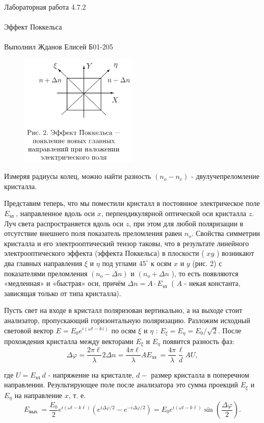 \documentclass{astroedu-lab}
\begin{document}
\begin{problem}{\huge Лабораторная работа 4.7.2\\\\Эффект Поккельса\\\\Выполнил Жданов Елисей Б01-205}
\begin{figure}[!h]
	\centering
	\includegraphics[width=0.5\textwidth]{th2.png}
	\label{fig:boiler}
\end{figure}




Измеряя радиусы колец, можно найти разность $\left(n_o-n_e\right)$ - двулучепреломление кристалла.

Представим теперь, что мы поместили кристалл в постоянное электрическое поле $E_{\text {эл }}$, направленное вдоль оси $x$, перпендикулярной оптической оси кристалла $z$. Луч света распространяется вдоль оси $z$, при этом для любой поляризации в отсутствие внешнего поля показатель преломления равен $n_o$. Свойства симметрии кристалла и его электрооптический тензор таковы, что в результате линейного электрооптического эффекта (эффекта Поккельса) в плоскости ( $x y$ ) возникают два главных направления $\xi$ и $\eta$ под углами $45^{\circ}$ к осям $x$ и $y$ (рис. 2) с показателями преломления $\left(n_o-\Delta n\right)$ и $\left(n_o+\Delta n\right.$ ), то есть появляются «медленная» и «быстрая» оси, причём $\Delta n=A \cdot E_{\text {эл }}$ ( $A$ - некая константа, зависящая только от типа кристалла).

Пусть свет на входе в кристалл поляризован вертикально, а на выходе стоит анализатор, пропускающий горизонтальную поляризацию. Разложим исходный световой вектор $E=E_0 e^{i(\omega t-k z)}$ по осям $\xi$ и $\eta$ : $E_{\xi}=E_\eta=E_0 / \sqrt{2}$. После прохождения кристалла между векторами $E_{\xi}$ и $E_\eta$ появится разность фаз:
$$
\Delta \varphi=\frac{2 \pi \ell}{\lambda} 2 \Delta n=\frac{4 \pi \ell}{\lambda} A E_{\text {эл }}=\frac{4 \pi}{\lambda} \frac{\ell}{d} A U,
$$

где $U=E_{\text {эл }} d$ - напряжение на кристалле, $d-$ размер кристалла в поперечном направлении. Результирующее поле после анализатора это сумма проекций $E_{\xi}$ и $E_\eta$ на направление $x$, т. е.
$$
E_{\text {вых }}=\frac{E_0}{2} e^{i(\omega t-k \ell)}\left(e^{i \Delta \varphi / 2}-e^{-i \Delta \varphi / 2}\right)=E_0 e^{i(\omega t-k \ell)} \sin \left(\frac{\Delta \varphi}{2}\right) .
$$


\end{problem}
\end{document}
